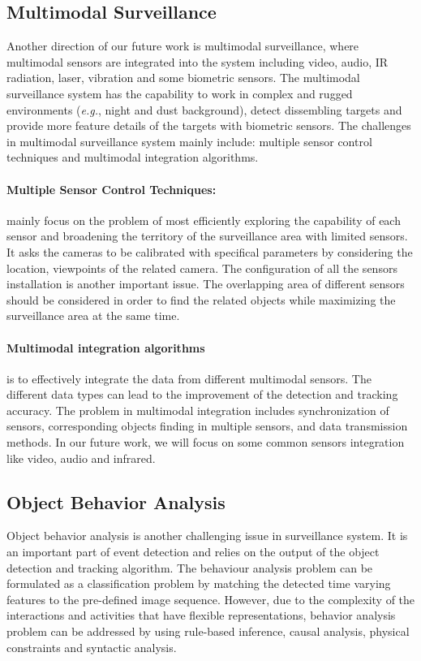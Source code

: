 \subsection{Multimodal Surveillance}
\indent \indent Another direction of our future work is multimodal surveillance, where multimodal sensors are integrated into the system including video, audio, IR radiation, laser, vibration and some biometric sensors. The multimodal surveillance system has the capability to work in complex and rugged environments (\emph{e.g.}, night and dust background), detect dissembling targets and provide more feature details of the targets with biometric sensors. The challenges in multimodal surveillance system mainly include: multiple sensor control techniques and multimodal integration algorithms.

\paragraph{Multiple Sensor Control Techniques:} mainly focus on the problem of most efficiently exploring the capability of each sensor and broadening the territory of the surveillance area with limited sensors. It asks the cameras to be calibrated with specifical parameters by considering the location, viewpoints of the related camera. The configuration of all the sensors installation is another important issue. The overlapping area of different sensors should be considered in order to find the related objects while maximizing the surveillance area at the same time.

\paragraph{Multimodal integration algorithms} is to effectively integrate the data from different multimodal sensors. The different data types can lead to the improvement of the detection and tracking accuracy. The problem in multimodal integration includes synchronization of sensors, corresponding objects finding in multiple sensors, and data transmission methods. In our future work, we will focus on some common sensors integration like video, audio and infrared.

\subsection{Object Behavior Analysis}
\indent \indent Object behavior analysis is another challenging issue in surveillance system. It is an important part of event detection and relies on the output of the object detection and tracking algorithm. The behaviour analysis problem can be formulated as a classification problem by matching the detected time varying features to the pre-defined image sequence. However, due to the complexity of the interactions and activities that have flexible representations, behavior analysis problem can be addressed by using rule-based inference, causal analysis, physical constraints and syntactic analysis.

